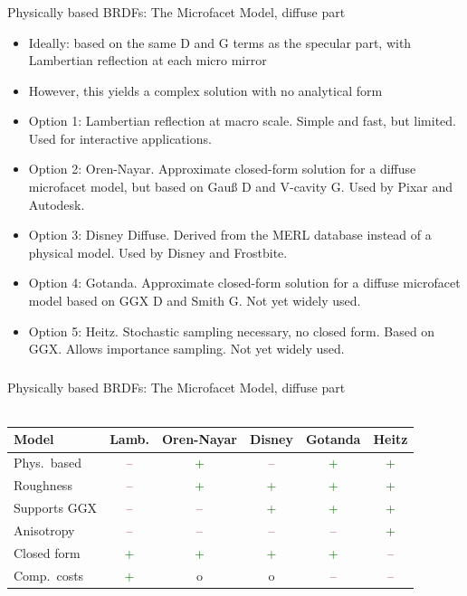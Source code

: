 \documentclass[utf8,stillsansserifmath,fleqn,t]{beamer}
\begin{document}
\begin{frame}
\frametitle{\insertsection}
Physically based BRDFs: The Microfacet Model, diffuse part
\begin{itemize}
\item Ideally: based on the same D and G terms as the specular part, with
Lambertian reflection at each micro mirror
\item However, this yields a complex solution with no analytical form
\item Option 1: Lambertian reflection at macro scale.
    Simple and fast, but limited. Used for interactive applications.
\item Option 2: Oren-Nayar. Approximate closed-form solution for a diffuse
microfacet model, but based on Gauß D and V-cavity G. Used by Pixar and Autodesk.
\item Option 3: Disney Diffuse. Derived from the MERL database instead of a physical model. Used by Disney and Frostbite.
\item Option 4: Gotanda. Approximate closed-form solution for a diffuse microfacet model based on GGX D and Smith G. Not yet widely used.
\item Option 5: Heitz. Stochastic sampling necessary, no closed form. Based on GGX. Allows importance sampling. Not yet widely used.
\end{itemize}
\end{frame}

\begin{frame}[label=materials-microfacet-diffuse]
\frametitle{\insertsection}
Physically based BRDFs: The Microfacet Model, diffuse part\\~\\
	\begin{tabular}{|l|c|c|c|c|c|}
		\hline
		Model        & Lamb. &  Oren-Nayar & Disney & Gotanda & Heitz  \\ \hline
		Phys.~based  & \textcolor{DarkRed}{--}     & \textcolor{DarkGreen}{+}  & \textcolor{DarkRed}{--}     & \textcolor{DarkGreen}{+}  & \textcolor{DarkGreen}{+} \\ \hline
		Roughness    & \textcolor{DarkRed}{--}     & \textcolor{DarkGreen}{+}  & \textcolor{DarkGreen}{+}    & \textcolor{DarkGreen}{+}  & \textcolor{DarkGreen}{+} \\ \hline
		Supports GGX & \textcolor{DarkRed}{--}     & \textcolor{DarkRed}{--}   & \textcolor{DarkGreen}{+}   & \textcolor{DarkGreen}{+}  & \textcolor{DarkGreen}{+} \\ \hline
		Anisotropy   & \textcolor{DarkRed}{--}     & \textcolor{DarkRed}{--}   & \textcolor{DarkRed}{--}    & \textcolor{DarkRed}{--}  & \textcolor{DarkGreen}{+} \\ \hline
		Closed form  & \textcolor{DarkGreen}{+}    & \textcolor{DarkGreen}{+}  & \textcolor{DarkGreen}{+}    & \textcolor{DarkGreen}{+}  & \textcolor{DarkRed}{--} \\ \hline
		Comp.~costs  & \textcolor{DarkGreen}{+}    & o      & o          & \textcolor{DarkRed}{--}       & \textcolor{DarkRed}{--}      \\ \hline
	\end{tabular}
\end{frame}
\end{document}
